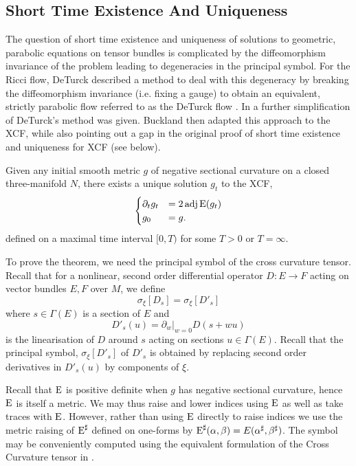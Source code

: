 \documentclass[a4paper,12pt]{amsart}
\begin{document}
\subsection{Short Time Existence And Uniqueness}
\label{subsec:xcf_existence_uniqueness}

The question of short time existence and uniqueness of solutions to geometric, parabolic equations on tensor bundles is complicated by the diffeomorphism invariance of the problem leading to degeneracies in the principal symbol. For the Ricci flow, DeTurck described a method to deal with this degeneracy by breaking the diffeomorphism invariance (i.e. fixing a gauge) to obtain an equivalent, strictly parabolic flow referred to as the DeTurck flow \cite{MR697987}. In \cite[Section 6]{MR1375255} a further simplification of DeTurck's method was given. Buckland then adapted this approach to the XCF, while also pointing out a gap in the original proof of short time existence and uniqueness for XCF \cite{MR2207496} (see  below).

\begin{thm}
\label{thm:xcf_existence_uniqueness}
Given any initial smooth metric \(g\) of negative sectional curvature on a closed three-manifold \(N\), there exists a unique solution \(g_t\) to the XCF,
\[
\begin{cases}
\partial_t g_t &= 2\operatorname{adj}\operatorname{E}(g_t) \\
g_0 &= g.
\end{cases}
\]
defined on a maximal time interval \([0, T)\) for some \(T > 0\) or \(T = \infty\).
\end{thm}

To prove the theorem, we need the principal symbol of the cross curvature tensor. Recall that for a nonlinear, second order differential operator \(D : E \to F\) acting on vector bundles \(E, F\) over \(M\), we define
\begin{equation}
\label{eq:symbol}
\sigma_{\xi} [D_s] = \sigma_{\xi} [D'_s]
\end{equation}
where \(s \in \Gamma(E)\) is a section of \(E\) and
\[
D'_s (u) = \partial_w|_{w=0} D(s + w u)
\]
is the linearisation of \(D\) around \(s\) acting on sections \(u \in \Gamma(E)\). Recall that the principal symbol, \(\sigma_{\xi} [D'_s]\) of \(D'_s\) is obtained by replacing second order derivatives in \(D'_s (u)\) by components of \(\xi\).

Recall that \(\operatorname{E}\) is positive definite when \(g\) has negative sectional curvature, hence \(\operatorname{E}\) is itself a metric. We may thus raise and lower indices using \(\operatorname{E}\) as well as take traces with \(\operatorname{E}\). However, rather than using \(\operatorname{E}\) directly to raise indices we use the metric raising of \(\operatorname{E}^{\sharp}\) defined on one-forms by \(\operatorname{E}^{\sharp} (\alpha, \beta) = E(\alpha^{\sharp}, \beta^{\sharp})\). The symbol may be conveniently computed using the equivalent formulation of the Cross Curvature tensor in .
\end{document}
